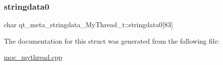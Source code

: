 \subsubsection{\texorpdfstring{stringdata0}{stringdata0}}
{\footnotesize\ttfamily char qt\+\_\+meta\+\_\+stringdata\+\_\+\+My\+Thread\+\_\+t\+::stringdata0\mbox{[}83\mbox{]}}



The documentation for this struct was generated from the following file\+:\begin{DoxyCompactItemize}
\item 
\mbox{\hyperlink{moc__mythread_8cpp}{moc\+\_\+mythread.\+cpp}}\end{DoxyCompactItemize}
